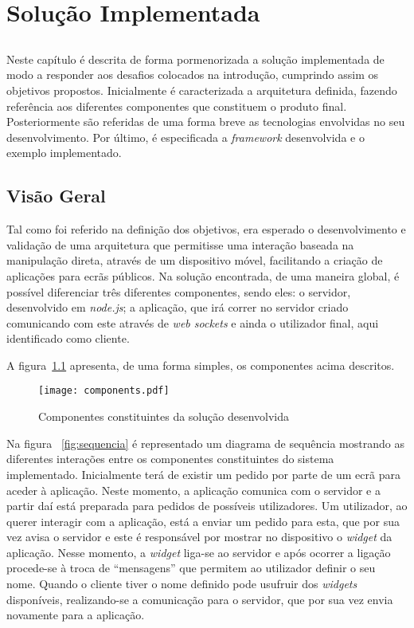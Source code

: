\chapter{Solução Implementada} \label{chap:sol}

\section*{}

Neste capítulo é descrita de forma pormenorizada a solução implementada de modo a responder aos desafios colocados na introdução, cumprindo assim os objetivos propostos.
Inicialmente é caracterizada a arquitetura definida, fazendo referência aos diferentes componentes que constituem o produto final. Posteriormente são referidas de uma forma breve as tecnologias envolvidas no seu desenvolvimento.
Por último, é especificada a \textit{framework} desenvolvida e o exemplo implementado.

\section{Visão Geral} \label{sec:geral}

Tal como foi referido na definição dos objetivos, era esperado o desenvolvimento e validação de uma arquitetura que permitisse uma interação baseada na manipulação direta, através de um dispositivo móvel, facilitando a criação de aplicações para ecrãs públicos.  
Na solução encontrada, de uma maneira global, é possível diferenciar três diferentes componentes, sendo eles: o servidor, desenvolvido em \textit{node.js}; a aplicação, que irá correr no servidor criado comunicando com este através de \textit{web sockets} e ainda o utilizador final, aqui identificado como cliente.

A figura~\ref{fig:componentes} apresenta, de uma forma simples, os componentes acima descritos.

\begin{figure}[ht]
\centering
\texttt{[image: components.pdf]}
\caption[Componentes] {Componentes constituintes da solução desenvolvida}
\label{fig:componentes}
\end{figure}

Na figura ~\ref{fig:sequencia} é representado um diagrama de sequência mostrando as diferentes interações entre os componentes constituintes do sistema implementado. Inicialmente terá de existir um pedido por parte de um ecrã para aceder à aplicação. Neste momento, a aplicação comunica com o servidor e a partir daí está preparada para pedidos de possíveis utilizadores. Um utilizador, ao querer interagir com a aplicação, está a enviar um pedido para esta, que por sua vez avisa o servidor e este é responsável por mostrar no dispositivo o \textit{widget} da aplicação. Nesse momento, a \textit{widget} liga-se ao servidor e após ocorrer a ligação procede-se à troca de ``mensagens'' que permitem ao utilizador definir o seu nome. Quando o cliente tiver o nome definido pode usufruir dos \textit{widgets} disponíveis, realizando-se a comunicação para o servidor, que por sua vez envia novamente para a aplicação.

